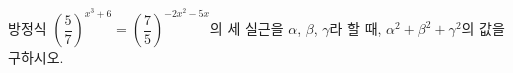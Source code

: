 방정식 $\left(\dfrac{5}{7}\right)^{x^3+6}=\left(\dfrac{7}{5}\right)^{-2x^2-5x}$의 세 실근을 $\alpha$, $\beta$, $\gamma$라 할 때, $\alpha^2+\beta^2+\gamma^2$의 값을 구하시오.
